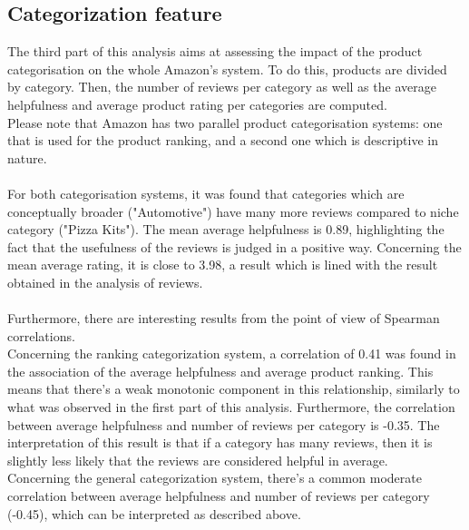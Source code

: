 \documentclass[11pt]{article}
\begin{document}
\subsection{Categorization feature}
The third part of this analysis aims at assessing the impact of the product categorisation on the whole Amazon's system. To do this, products are divided by category. Then, the number of reviews per category as well as the average helpfulness and average product rating per categories are computed.\\
Please note that Amazon has two parallel product categorisation systems: one that is used for the product ranking, and a second one which is descriptive in nature.\\\\
For both categorisation systems, it was found that categories which are conceptually broader ("Automotive") have many more reviews compared to niche category ("Pizza Kits"). The mean average helpfulness is 0.89, highlighting the fact that the usefulness of the reviews is judged in a positive way. Concerning the mean average rating, it is close to 3.98, a result which is lined with the result obtained in the analysis of reviews.\\\\
Furthermore, there are interesting results from the point of view of Spearman correlations.\\
Concerning the ranking categorization system, a correlation of 0.41 was found in the association of the average helpfulness and average product ranking. This means that there's a weak monotonic component in this relationship, similarly to what was observed in the first part of this analysis. Furthermore, the correlation between average helpfulness and number of reviews per category is -0.35. The interpretation of this result is that if a category has many reviews, then it is slightly less likely that the reviews are considered helpful in average. \\
Concerning the general categorization system, there's a common moderate correlation between average helpfulness and number of reviews per category (-0.45), which can be interpreted as described above.
\end{document}
